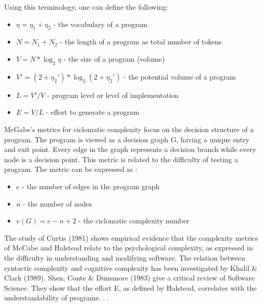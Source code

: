 \documentclass{article}
\begin{document}
Using this terminology, one can define the following:\par
\begin{itemize}
\item $\eta = \eta_1 + \eta_2 $ - the vocabulary of a program \par
\item $N = N_1 + N_2 $ - the length of a program as total number of tokens \par
\item $V = N * \log _2 \eta $ - the size of a program (volume) \par
\item $V' = (2 + \eta_2')*\log_2(2 + \eta_2')$ - the potential volume of a program \par
\item $L = V' / V $ - program level or level of implementation \par
\item $E = V / L $ - effort to generate a program
\end{itemize}

McGabe's metrics for ciclomatic complexity focus on the decision structure of a program. The program is viewed as a decision graph G, having a unique entry and exit point. Every edge in the graph represents a decision branch while every node is a decision point. This metric is related to the difficulty of testing a program. The metric can be expressed as :
\begin{itemize}
\item $e$ - the number of edges in the program graph \par
\item $n$ - the number of nodes \par
\item $v(G) = e - n + 2$ - the ciclomatic complexity number
\end{itemize}

The study of Curtis (1981) shows empirical evidence that the complexity metrics of McCabe and Halstead relate to the psychological complexity, as expressed in the difficulty in understanding and modifying software. The relation between syntactic complexity and cognitive complexity has been investigated by Khalil \& Clark (1989). Shen, Conte \& Dunsmore (1983) give a critical review of Software Science. They show that the effort E, as defined by Halstead, correlates with the understandability of programs. . \cite{DBLP:journals/infsof/BergB95}. \par
\end{document}
